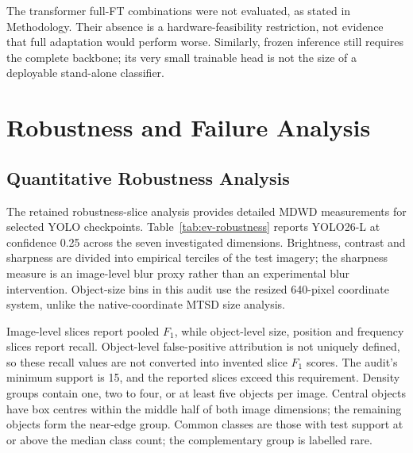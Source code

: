 The transformer full-\gls{FT} combinations were not evaluated, as stated in Methodology. Their absence is a hardware-feasibility restriction, not evidence that full adaptation would perform worse. Similarly, frozen inference still requires the complete backbone; its very small trainable head is not the size of a deployable stand-alone classifier.

\clearpage
\section{Robustness and Failure Analysis}
\label{sec:ev-robustness}
\subsection{Quantitative Robustness Analysis}
\label{sec:ev-robustness-quantitative}
The retained robustness-slice analysis provides detailed \gls{MDWD} measurements for selected YOLO checkpoints. Table~\ref{tab:ev-robustness} reports YOLO26-L at confidence 0.25 across the seven investigated dimensions. Brightness, contrast and sharpness are divided into empirical terciles of the test imagery; the sharpness measure is an image-level blur proxy rather than an experimental blur intervention. Object-size bins in this audit use the resized 640-pixel coordinate system, unlike the native-coordinate MTSD size analysis.

Image-level slices report pooled \(F_1\), while object-level size, position and frequency slices report recall. Object-level false-positive attribution is not uniquely defined, so these recall values are not converted into invented slice \(F_1\) scores. The audit's minimum support is 15, and the reported slices exceed this requirement. Density groups contain one, two to four, or at least five objects per image. Central objects have box centres within the middle half of both image dimensions; the remaining objects form the near-edge group. Common classes are those with test support at or above the median class count; the complementary group is labelled rare.

